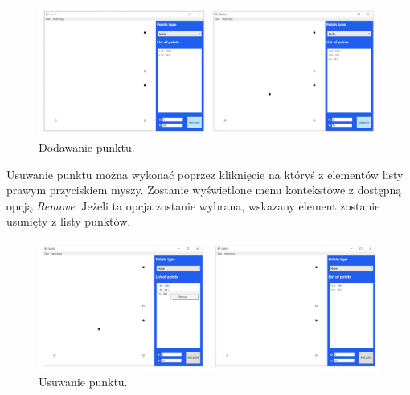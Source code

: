 \documentclass[10pt,a4paper]{article}
\begin{document}
	\begin{figure}[H]
		\centering	
		\includegraphics[scale=0.4]{images/add.png}
 		\caption{Dodawanie punktu.}
 		\label{fig:algorithm_diagram}
	\end{figure}	

	Usuwanie punktu można wykonać poprzez kliknięcie na któryś z elementów listy prawym przyciskiem myszy. Zostanie wyświetlone menu kontekstowe z dostępną opcją \textit{Remove}. Jeżeli ta opcja zostanie wybrana, wskazany element zostanie usunięty z listy punktów.
		
	\begin{figure}[H]
		\centering
 		\includegraphics[scale=0.4]{images/remove.png}
 		\caption{Usuwanie punktu.}
 		\label{fig:algorithm_diagram}
	\end{figure}
\end{document}
